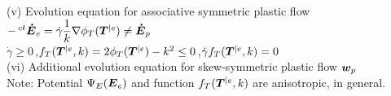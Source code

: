 \documentclass[preprint,review,12pt,sort&compress]{elsarticle}%
\renewcommand{\mathbf}[1]{\mbox{\boldmath $#1$ \unboldmath}  \!\!}
\begin{document}
\begin{table}[h]
\begin{center}
\begin{tabular}
\begin{tabular}
(v) Evolution equation for associative symmetric plastic flow\medskip\\
\qquad$-\,^{ct}\mathbf{\dot{E}}_{e}=\dot{\gamma}\dfrac{1}{k}\nabla\phi
_{T}(\mathbf{T}^{|e})\neq\mathbf{\dot{E}}_{p}$\medskip\\
\qquad$\dot{\gamma}\geq0$\,,\quad$f_{T}(\mathbf{T}^{|e},k)=2\phi
_{T}(\mathbf{T}^{|e})-k^{2}\leq0$\,,\quad$\dot{\gamma}f_{T}(\mathbf{T}%
^{|e},k)=0$\bigskip\\
(vi) Additional evolution equation for skew-symmetric plastic flow
$\mathbf{w}_{p}$\medskip\\
{\small {Note: Potential $\Psi_{E}(\mathbf{E}_{e})$ and function
$f_{T}(\mathbf{T}^{|e},k)$ are anisotropic, in general.}\bigskip}\\
\end{tabular}
\\\hline
\end{tabular}
\end{center}
\end{table}
\end{document}
